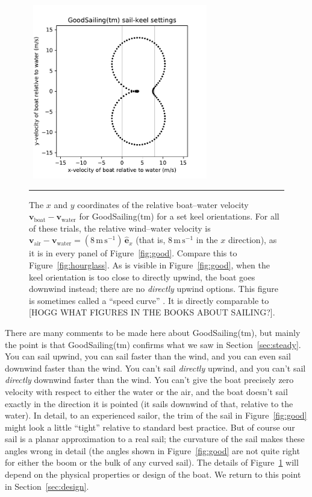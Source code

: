 \documentclass[letterpaper]{article}
\renewcommand{\vec}[1]{\boldsymbol{#1}}
\newcommand{\uvec}{\vec{\hat{e}}}
\newcommand{\air}{\text{air}}
\newcommand{\water}{\text{water}}
\newcommand{\boat}{\text{boat}}
\newcommand{\vair}{\vec{v}_\air}
\newcommand{\vwater}{\vec{v}_\water}
\newcommand{\vboat}{\vec{v}_\boat}
\newcommand{\mps}{\mathrm{m\,s^{-1}}}
\newcommand{\secref}[1]{Section~\ref{#1}}
\newcommand{\figref}[1]{Figure~\ref{#1}}
\newcommand{\figurerule}{\rule[1ex]{\textwidth}{0.2pt}}
\begin{document}
\begin{figure}[t!]
  ~\hfill\includegraphics[width=3in]{hourglass-good.pdf}\hfill~
  \caption{The $x$ and $y$ coordinates of the relative boat--water velocity $\vboat-\vwater$ for GoodSailing(tm) for a set keel orientations.
  For all of these trials, the relative wind--water velocity is $\vair-\vwater=(8\,\mps)\,\uvec_x$ (that is, $8\,\mps$ in the $x$ direction), as it is in every panel of \figref{fig:good}.
  Compare this to \figref{fig:hourglass}.
  As is visible in \figref{fig:good}, when the keel orientation is too close to directly upwind, the boat goes downwind instead; there are no \emph{directly} upwind options. This figure is sometimes called a ``speed curve'' \cite{pos}. It is directly comparable to [HOGG WHAT FIGURES IN THE BOOKS ABOUT SAILING?].\label{fig:hourgood}}
  \figurerule
\end{figure}

There are many comments to be made here about GoodSailing(tm), but mainly the point is that GoodSailing(tm) confirms what we saw in \secref{sec:steady}.
You can sail upwind, you can sail faster than the wind, and you can even sail downwind faster than the wind.
You can't sail \emph{directly} upwind, and you can't sail \emph{directly} downwind faster than the wind.
You can't give the boat precisely zero velocity with respect to either the water or the air, and the boat doesn't sail exactly in the direction it is pointed (it sails downwind of that, relative to the water).
In detail, to an experienced sailor, the trim of the sail in \figref{fig:good} might look a little ``tight'' relative to standard best practice.
But of course our sail is a planar approximation to a real sail; the curvature of the sail makes these angles wrong in detail (the angles shown in \figref{fig:good} are not quite right for either the boom or the bulk of any curved sail).
The details of \figref{fig:hourgood} will depend on the physical properties or design of the boat.
We return to this point in \secref{sec:design}.
\end{document}
